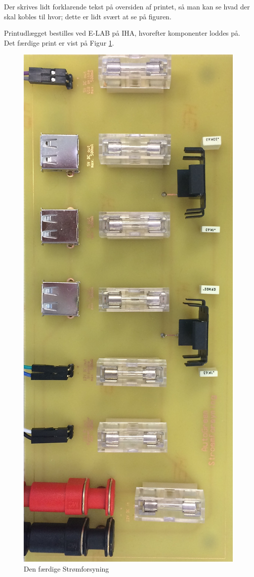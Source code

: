 Der skrives lidt forklarende tekst på oversiden af printet, så man kan se hvad der skal kobles til hvor; dette er lidt svært at se på figuren.
\newline

Printudlægget bestilles ved E-LAB på IHA, hvorefter komponenter loddes på.
Det færdige print er vist på Figur \ref{fig:stroemforsyning_print}.

\begin{figure}[h]
\centering 
\includegraphics[width={\textwidth}, trim=0 0 0 0, clip=true] {../fig/StroemforsyningPrintBillede}
\caption{Den færdige Strømforsyning}
\label{fig:stroemforsyning_print}
\end{figure} 

\clearpage
